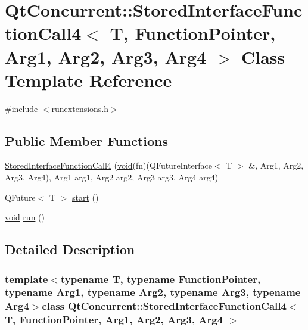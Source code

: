 \hypertarget{class_qt_concurrent_1_1_stored_interface_function_call4}{\section{\-Qt\-Concurrent\-:\-:\-Stored\-Interface\-Function\-Call4$<$ \-T, \-Function\-Pointer, \-Arg1, \-Arg2, \-Arg3, \-Arg4 $>$ \-Class \-Template \-Reference}
\label{class_qt_concurrent_1_1_stored_interface_function_call4}
}


{\ttfamily \#include $<$runextensions.\-h$>$}

\subsection*{\-Public \-Member \-Functions}
\begin{DoxyCompactItemize}
\item 
\hyperlink{class_qt_concurrent_1_1_stored_interface_function_call4_ac3df3397ec523fed6a1e2ffdbc6d8c73}{\-Stored\-Interface\-Function\-Call4} (\hyperlink{group___u_a_v_objects_plugin_ga444cf2ff3f0ecbe028adce838d373f5c}{void}(fn)(\-Q\-Future\-Interface$<$ \-T $>$ \&, \-Arg1, \-Arg2, \-Arg3, \-Arg4), \-Arg1 arg1, \-Arg2 arg2, \-Arg3 arg3, \-Arg4 arg4)
\item 
\-Q\-Future$<$ \-T $>$ \hyperlink{class_qt_concurrent_1_1_stored_interface_function_call4_a79b19894bb0a5c7464a1cf1df83dcede}{start} ()
\item 
\hyperlink{group___u_a_v_objects_plugin_ga444cf2ff3f0ecbe028adce838d373f5c}{void} \hyperlink{class_qt_concurrent_1_1_stored_interface_function_call4_a4109c8906c4ef0111e5c992eb796ebc8}{run} ()
\end{DoxyCompactItemize}


\subsection{\-Detailed \-Description}
\subsubsection*{template$<$typename T, typename Function\-Pointer, typename Arg1, typename Arg2, typename Arg3, typename Arg4$>$class Qt\-Concurrent\-::\-Stored\-Interface\-Function\-Call4$<$ T, Function\-Pointer, Arg1, Arg2, Arg3, Arg4 $>$}



